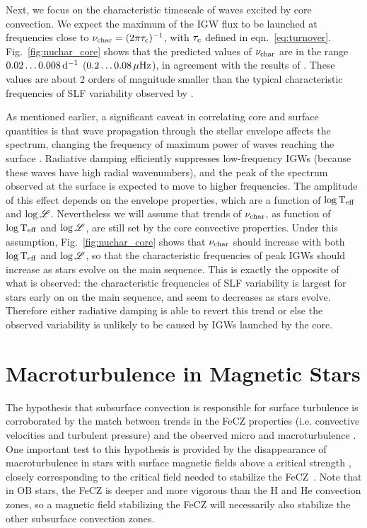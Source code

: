 \documentclass[twocolumn]{aastex63}
\begin{document}
Next, we focus on the characteristic timescale of waves excited by core convection. 
We expect the maximum of the IGW flux to be launched at frequencies close to $\nu_{\rm char} = (2\pi\tau_{\rm c})^{-1}$, with $\tau_{\rm c}$ defined in eqn.~\ref{eq:turnover}.
Fig.~\ref{fig:nuchar_core} shows that the predicted values of $\nu_{\rm char}$ are in the range $0.02\dots0.008\,{\rm  d}^{-1}$ ($0.2\dots0.08\, \mu\textrm{Hz}$), in agreement with the results of \citet{Shiode:2013}.
These values are about 2 orders of magnitude smaller than the typical characteristic frequencies of  SLF variability observed by \citep{Bowman:2019,2019NatAs...3..760B}.

As mentioned earlier, a significant caveat in correlating core and surface quantities is that wave propagation through the stellar envelope affects the spectrum, changing the frequency of maximum power of waves reaching the surface \citep{Lecoanet:2020}.
Radiative damping efficiently suppresses low-frequency IGWs (because these waves have high radial wavenumbers), and the peak of the spectrum observed at the surface is expected to move to higher frequencies. The amplitude of this effect depends on the envelope properties, which are a function of $\log {\rm T}_{\rm eff}$ and $\log \mathscr{L}$. Nevertheless we will assume that trends of $\nu_{\rm char}$, as function of $\log {\rm T}_{\rm eff}$ and $\log \mathscr{L}$, are still set by the core convective properties. 
Under this assumption, Fig.~\ref{fig:nuchar_core} shows that $\nu_{\rm char}$ should increase with both $\log {\rm T}_{\rm eff}$ and $\log \mathscr{L}$, so that the characteristic frequencies of peak IGWs should increase as stars evolve on the main sequence. This is exactly the opposite of what is observed:  the characteristic frequencies of SLF variability is largest for stars early on on the main sequence, and seem to decreases as stars evolve.  
Therefore either radiative damping is able to revert this trend or else the observed variability is unlikely to be caused by IGWs launched by the core. 


\section{Macroturbulence in Magnetic Stars}

The hypothesis that subsurface convection is responsible for surface turbulence is corroborated by the match between trends in the FeCZ properties (i.e. convective velocities and turbulent pressure) and the observed micro and macroturbulence \citep{Cantiello:2009,Grassitelli:2015}.
One important test to this hypothesis is provided by the disappearance of macroturbulence in stars with surface magnetic fields above a critical strength \citep{10.1093/mnras/stt921}, closely corresponding to 
the critical field needed to stabilize the FeCZ~\citep{2019MNRAS.487.3904M,Jermyn:2020}. Note that in OB stars, the FeCZ is deeper and more vigorous than the H and He convection zones, so a magnetic field stabilizing the FeCZ will necessarily also stabilize the other subsurface convection zones.  
\end{document}
